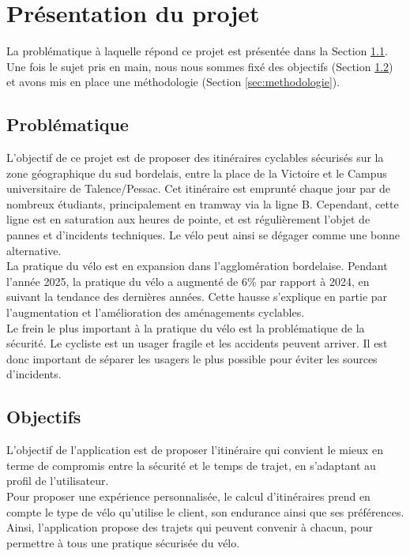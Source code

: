\section{Présentation du projet}
\noindent La problématique à laquelle répond ce projet est présentée dans la Section \ref{sec:problematique}.
Une fois le sujet pris en main, nous nous sommes fixé des objectifs (Section \ref{sec:objectifs}) et avons mis en place une méthodologie (Section \ref{sec:methodologie}).

\subsection{Problématique}
\label{sec:problematique}
\noindent L’objectif de ce projet est de proposer des itinéraires cyclables sécurisés sur la zone géographique du sud bordelais, entre la place de la Victoire et le Campus universitaire de Talence/Pessac. 
Cet itinéraire est emprunté chaque jour par de nombreux étudiants, principalement en tramway via la ligne B.
Cependant, cette ligne est en saturation aux heures de pointe, et est régulièrement l’objet de pannes et d’incidents techniques.
Le vélo peut ainsi se dégager comme une bonne alternative.\\

\noindent La pratique du vélo est en expansion dans l'agglomération bordelaise.
Pendant l’année 2025, la pratique du vélo a augmenté de 6\% par rapport à 2024, en suivant la tendance des dernières années.
Cette hausse s'explique en partie par l'augmentation et l'amélioration des aménagements cyclables.\\

\noindent Le frein le plus important à la pratique du vélo est la problématique de la sécurité.
Le cycliste est un usager fragile et les accidents peuvent arriver.
Il est donc important de séparer les usagers le plus possible pour éviter les sources d’incidents.\\

\subsection{Objectifs}
\label{sec:objectifs}
\noindent L’objectif de l’application est de proposer l’itinéraire qui convient le mieux en terme de compromis entre la sécurité et le temps de trajet, en s’adaptant au profil de l’utilisateur.\\

\noindent Pour proposer une expérience personnalisée, le calcul d'itinéraires prend en compte le type de vélo qu'utilise le client, son endurance ainsi que ses préférences.
Ainsi, l'application propose des trajets qui peuvent convenir à chacun, pour permettre à tous une pratique sécurisée du vélo.\\


